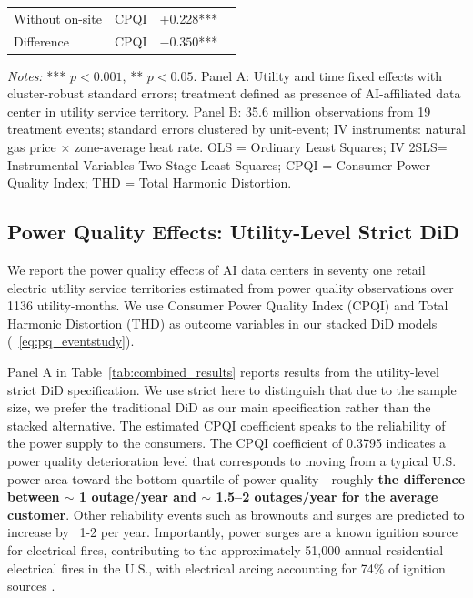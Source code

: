 \documentclass[a4paper,fleqn,longmktitle]{cas-sc}
\newcommand{\nb}[1]{\textcolor{blue}{NB[#1]}}
\theoremstyle{plain}
\theoremstyle{definition}
\begin{document}
\begin{table}[t]
\begin{tabular}{llcp{10cm}}
Without on-site & CPQI & +0.228*** & \\
Difference & CPQI & $-0.350$*** & \\
\bottomrule
\end{tabular}
\begin{flushleft}
\footnotesize\textit{Notes:} *** $p < 0.001$, ** $p < 0.05$. Panel A: Utility and time fixed effects with cluster-robust standard errors; treatment defined as presence of AI-affiliated data center in utility service territory. Panel B: 35.6 million observations from 19 treatment events; standard errors clustered by unit-event; IV instruments: natural gas price $\times$ zone-average heat rate. OLS = Ordinary Least Squares; IV 2SLS= Instrumental Variables Two Stage Least Squares; CPQI = Consumer Power Quality Index; THD = Total Harmonic Distortion. 
\end{flushleft}
\end{table}

\subsection{Power Quality Effects: Utility-Level Strict DiD}\label{subsec:power-quality-results}

We report the power quality effects of AI data centers in seventy one retail electric utility service territories estimated from power quality observations over 1136 utility-months. We use Consumer Power Quality Index (CPQI) and Total Harmonic Distortion (THD) as outcome variables in our stacked DiD models (~\autoref{eq:pq_eventstudy}). 

Panel A in Table~\ref{tab:combined_results} reports results from the utility-level strict DiD specification. We use strict here to distinguish that due to the sample size, we prefer the traditional DiD as our main specification rather than the stacked alternative.
The estimated CPQI coefficient speaks to the reliability of the power supply to the consumers. The CPQI coefficient of 0.3795 indicates a power quality deterioration level that corresponds to moving from a typical U.S. power area toward the bottom quartile of power quality—roughly \textbf{the difference between $\sim$ 1 outage/year and $\sim$ 1.5–2 outages/year for the average customer}. Other reliability events such as brownouts and surges are predicted to increase by ~1-2 per year. Importantly, power surges are a known ignition source for electrical fires, contributing to the approximately 51,000 annual residential electrical fires in the U.S., with electrical arcing accounting for 74\% of ignition sources \cite{usfa2019electrical}. 
\end{document}
